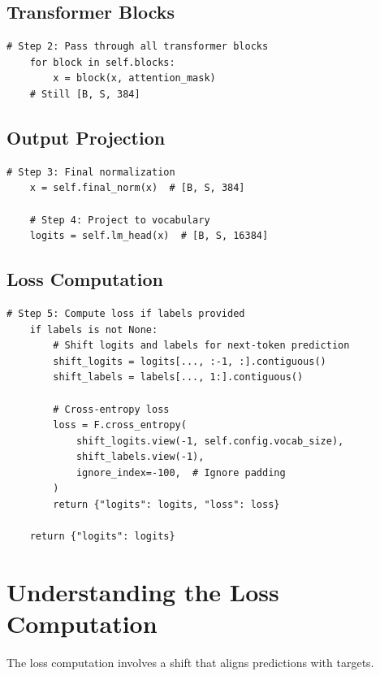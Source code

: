 \subsection{Transformer Blocks}

\begin{lstlisting}[style=python]
    # Step 2: Pass through all transformer blocks
    for block in self.blocks:
        x = block(x, attention_mask)
    # Still [B, S, 384]
\end{lstlisting}

\subsection{Output Projection}

\begin{lstlisting}[style=python]
    # Step 3: Final normalization
    x = self.final_norm(x)  # [B, S, 384]

    # Step 4: Project to vocabulary
    logits = self.lm_head(x)  # [B, S, 16384]
\end{lstlisting}

\subsection{Loss Computation}

\begin{lstlisting}[style=python]
    # Step 5: Compute loss if labels provided
    if labels is not None:
        # Shift logits and labels for next-token prediction
        shift_logits = logits[..., :-1, :].contiguous()
        shift_labels = labels[..., 1:].contiguous()

        # Cross-entropy loss
        loss = F.cross_entropy(
            shift_logits.view(-1, self.config.vocab_size),
            shift_labels.view(-1),
            ignore_index=-100,  # Ignore padding
        )
        return {"logits": logits, "loss": loss}

    return {"logits": logits}
\end{lstlisting}

\section{Understanding the Loss Computation}

The loss computation involves a shift that aligns predictions with targets.

